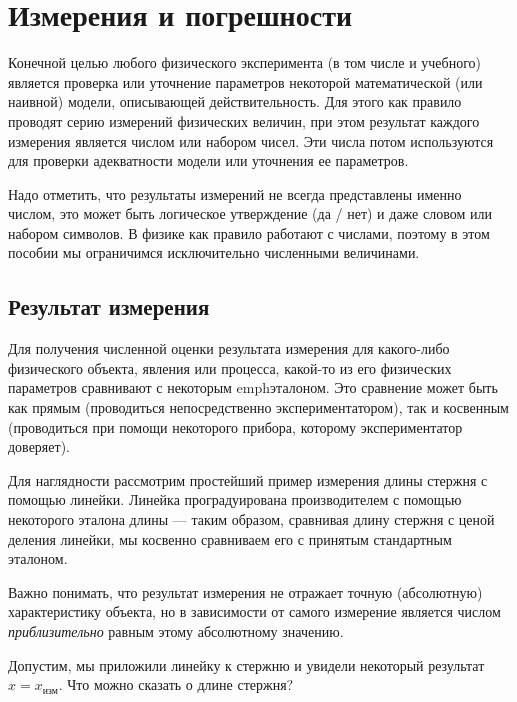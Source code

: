 \chapter{Измерения и погрешности}


Конечной целью любого физического эксперимента (в том числе и учебного) является
проверка или уточнение параметров некоторой математической (или наивной) модели,
описывающей действительность. Для этого как правило проводят серию измерений
физических величин, при этом результат каждого измерения является числом или
набором чисел. Эти числа потом используются для проверки адекватности модели или
уточнения ее параметров.

Надо отметить, что результаты измерений не всегда представлены именно числом,
это может быть логическое утверждение (да / нет) и даже словом или набором
символов. В физике как правило работают с числами, поэтому в этом пособии мы
ограничимся исключительно численными величинами.

\section{Результат измерения}

Для получения численной оценки результата измерения для какого-либо физического
объекта, явления или процесса, какой-то из его физических параметров сравнивают
с некоторым emph{эталоном}. Это сравнение может быть как прямым (проводиться
непосредственно экспериментатором), так и косвенным (проводиться при помощи
некоторого прибора, которому экспериментатор доверяет).

Для наглядности рассмотрим простейший пример измерения длины стержня
с помощью линейки. Линейка проградуирована производителем с помощью
некоторого эталона длины --- таким образом, сравнивая длину
стержня с ценой деления линейки, мы косвенно сравниваем его с принятым
стандартным эталоном.

Важно понимать, что результат измерения не отражает точную (абсолютную)
характеристику объекта, но в зависимости от самого измерение является числом
\emph{приблизительно} равным этому абсолютному значению.

Допустим, мы приложили линейку к стержню и увидели некоторый результат
$x=x_{\text{изм}}$. Что можно сказать о длине стержня?

